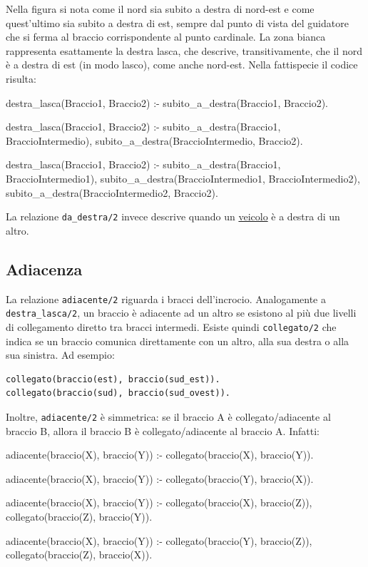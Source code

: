 Nella figura si nota come il nord sia subito a destra di nord-est e come quest'ultimo sia subito a destra di est, sempre dal punto di vista del guidatore che si ferma al braccio corrispondente al punto cardinale. La zona bianca rappresenta esattamente la destra lasca, che descrive, transitivamente, che il nord è a destra di est (in modo lasco), come anche nord-est. Nella fattispecie il codice risulta:

\begin{verbatimtab}
destra_lasca(Braccio1, Braccio2) :-
	subito_a_destra(Braccio1, Braccio2).

destra_lasca(Braccio1, Braccio2) :-
	subito_a_destra(Braccio1, BraccioIntermedio),
	subito_a_destra(BraccioIntermedio, Braccio2).

destra_lasca(Braccio1, Braccio2) :-
	subito_a_destra(Braccio1, BraccioIntermedio1),
	subito_a_destra(BraccioIntermedio1, BraccioIntermedio2),
	subito_a_destra(BraccioIntermedio2, Braccio2).
\end{verbatimtab}

La relazione \texttt{da\_destra/2} invece descrive quando un \underline{veicolo} è a destra di un altro.


\subsection{Adiacenza}
La relazione \texttt{adiacente/2} riguarda i bracci dell'incrocio. Analogamente a \texttt{destra\_lasca/2}, un braccio è adiacente ad un altro se esistono al più due livelli di collegamento diretto tra bracci intermedi. Esiste quindi \texttt{collegato/2} che indica se un braccio comunica direttamente con un altro, alla sua destra o alla sua sinistra. Ad esempio:
\begin{verbatim}
collegato(braccio(est), braccio(sud_est)).
collegato(braccio(sud), braccio(sud_ovest)).
\end{verbatim}

Inoltre, \texttt{adiacente/2} è simmetrica: se il braccio A è collegato/adiacente al braccio B, allora il braccio B è collegato/adiacente al braccio A. Infatti:

\begin{verbatimtab}
adiacente(braccio(X), braccio(Y)) :-
	collegato(braccio(X), braccio(Y)).

adiacente(braccio(X), braccio(Y)) :-
	collegato(braccio(Y), braccio(X)).

adiacente(braccio(X), braccio(Y)) :-
	collegato(braccio(X), braccio(Z)),
	collegato(braccio(Z), braccio(Y)).

adiacente(braccio(X), braccio(Y)) :-
	collegato(braccio(Y), braccio(Z)),
	collegato(braccio(Z), braccio(X)).
\end{verbatimtab}

